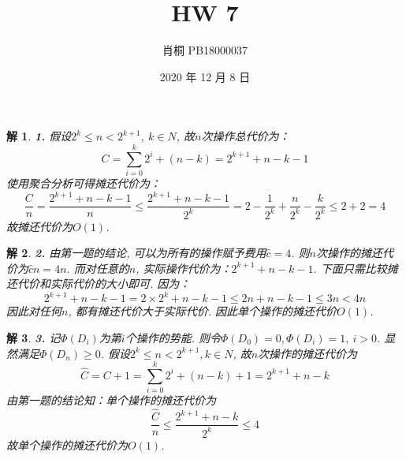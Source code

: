 \documentclass{article}
\begin{document}
	\title{HW 7}
	\author{肖桐 PB18000037}
	\date{2020 年 12 月 8 日}
	\maketitle

	\newtheorem*{solution}{解}

	\begin{solution}\textnormal{\textbf{1.}}
		假设$2^k \leq n < 2^{k + 1},\ k \in N$, 故$n$次操作总代价为：
		$$
		C = \sum_{i = 0}^{k}2^{i} + (n - k) = 2^{k + 1} + n - k - 1
		$$
		使用聚合分析可得摊还代价为：
		$$
		\dfrac{C}{n} = \dfrac{2^{k + 1} + n - k - 1}{n} \leq \dfrac{2^{k + 1} + n - k - 1}{2^k} = 2 - \dfrac{1}{2^k} + \dfrac{n}{2^k} - \dfrac{k}{2^k} \leq 2 + 2 = 4
		$$
		故摊还代价为$O(1)$.
	\end{solution}
	\begin{solution}\textnormal{\textbf{2.}}
		由第一题的结论, 可以为所有的操作赋予费用$\hat{c} = 4$. 则$n$次操作的摊还代价为$\hat{c}n = 4n$.\newline
		而对任意的$n$, 实际操作代价为：$2^{k + 1} + n - k - 1$. 下面只需比较摊还代价和实际代价的大小即可.\newline
		因为：
		$$
			2^{k + 1} + n - k - 1 = 2 \times 2^k + n - k - 1 \leq 2n + n - k - 1 \leq 3n < 4n
		$$
		因此对任何$n$, 都有摊还代价大于实际代价. 因此单个操作的摊还代价$O(1)$.
	\end{solution}
	\begin{solution}\textnormal{\textbf{3.}}
		记$\Phi(D_i)$为第$i$个操作的势能. 则令$\Phi(D_0) = 0, \Phi(D_i) = 1,\ i > 0$. 显然满足$\Phi(D_n) \geq 0$.\newline
		假设$2^k \leq n < 2^{k + 1}, k \in N$, 故$n$次操作的摊还代价为
		$$
		\hat{C} = C + 1 = \sum_{i = 0}^{k}2^i + (n - k) + 1 = 2^{k + 1} + n - k
		$$
		由第一题的结论知：单个操作的摊还代价为
		$$
		\dfrac{\hat{C}}{n} \leq \dfrac{2^{k + 1} + n - k}{2^k} \leq 4
		$$
		故单个操作的摊还代价为$O(1)$.
	\end{solution}
\end{document}
